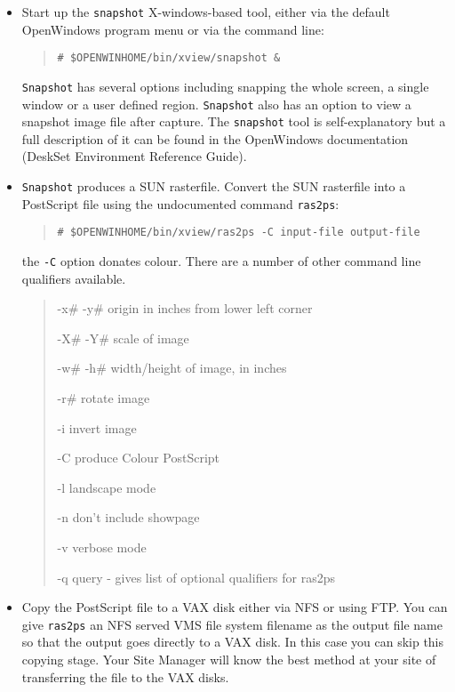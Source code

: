 \begin{itemize}

\item Start up the {\tt snapshot} X-windows-based tool, either via
the default OpenWindows
program menu or via the command line:

\begin{quote}

{\tt \# \$OPENWINHOME/bin/xview/snapshot \&}

\end{quote}

{\tt Snapshot} has several options including snapping the whole screen, a
single window or a user defined region. {\tt Snapshot} also has an option to view a snapshot image file
after capture. The {\tt snapshot} tool is self-explanatory but a full
description of it can be found in the OpenWindows documentation (DeskSet
Environment Reference Guide).

\item {\tt Snapshot} produces a SUN
rasterfile. Convert the SUN rasterfile into a PostScript file using the
undocumented command {\tt ras2ps}:

\begin{quote}

    {\tt \# \$OPENWINHOME/bin/xview/ras2ps -C input-file output-file}

\end{quote}

the {\tt -C} option donates colour. There are a number of other
command line qualifiers available.

\begin{quote}
{\tt

-x\# -y\#   origin in inches from lower left corner

-X\# -Y\#   scale of image

-w\# -h\#   width/height of image, in inches

-r\#       rotate image

-i        invert image

-C        produce Colour PostScript

-l        landscape mode

-n        don't include showpage

-v        verbose mode

-q        query - gives list of optional qualifiers for ras2ps

}
\end{quote}

\item Copy the PostScript file to a VAX disk either via NFS  or using FTP. You
can give {\tt ras2ps} an NFS served VMS file system filename as the output file
name so that the output goes directly to a VAX disk. In this case you can skip
this copying stage. Your Site Manager will know the best method at your site
of transferring the file to the VAX disks.


\end{itemize}
